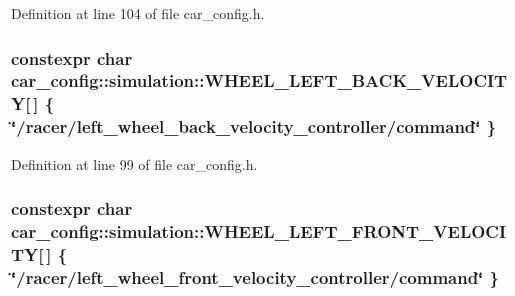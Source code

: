 Definition at line 104 of file car\+\_\+config.\+h.

\subsubsection[{\texorpdfstring{W\+H\+E\+E\+L\+\_\+\+L\+E\+F\+T\+\_\+\+B\+A\+C\+K\+\_\+\+V\+E\+L\+O\+C\+I\+TY}{WHEEL_LEFT_BACK_VELOCITY}}]{\setlength{\rightskip}{0pt plus 5cm}constexpr char car\+\_\+config\+::simulation\+::\+W\+H\+E\+E\+L\+\_\+\+L\+E\+F\+T\+\_\+\+B\+A\+C\+K\+\_\+\+V\+E\+L\+O\+C\+I\+TY\mbox{[}$\,$\mbox{]} \{ \char`\"{}/racer/left\+\_\+wheel\+\_\+back\+\_\+velocity\+\_\+controller/command\char`\"{} \}}\hypertarget{namespacecar__config_1_1simulation_ad5b5204b67d98be9a93418b41f9c5e1e}{}\label{namespacecar__config_1_1simulation_ad5b5204b67d98be9a93418b41f9c5e1e}


Definition at line 99 of file car\+\_\+config.\+h.

\subsubsection[{\texorpdfstring{W\+H\+E\+E\+L\+\_\+\+L\+E\+F\+T\+\_\+\+F\+R\+O\+N\+T\+\_\+\+V\+E\+L\+O\+C\+I\+TY}{WHEEL_LEFT_FRONT_VELOCITY}}]{\setlength{\rightskip}{0pt plus 5cm}constexpr char car\+\_\+config\+::simulation\+::\+W\+H\+E\+E\+L\+\_\+\+L\+E\+F\+T\+\_\+\+F\+R\+O\+N\+T\+\_\+\+V\+E\+L\+O\+C\+I\+TY\mbox{[}$\,$\mbox{]} \{ \char`\"{}/racer/left\+\_\+wheel\+\_\+front\+\_\+velocity\+\_\+controller/command\char`\"{} \}}\hypertarget{namespacecar__config_1_1simulation_a13f0760806f194b285a499947ec01ae3}{}\label{namespacecar__config_1_1simulation_a13f0760806f194b285a499947ec01ae3}


